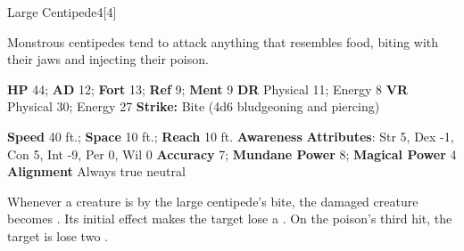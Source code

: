   \begin{monsection}{Large Centipede}{4}[4]
    \vspace{-1em}\vspace{-1em}
    \vspace{0em}

    
    Monstrous centipedes tend to attack anything that resembles food, biting with their jaws and injecting their poison.
  
    

    \begin{spellcontent}
      \begin{spelltargetinginfo}
        \pari \textbf{HP} 44;
          \textbf{AD} 12;
          \textbf{Fort} 13;
          \textbf{Ref} 9;
          \textbf{Ment} 9
        \pari \textbf{DR} Physical 11; Energy 8
        \pari \textbf{VR} Physical 30; Energy 27
        \pari \textbf{Strike:}
            Bite  (4d6 bludgeoning and piercing)
      \end{spelltargetinginfo}
    \end{spellcontent}
    \begin{monsterfooter}
      \pari \textbf{Speed} 40 ft.;
        \textbf{Space} 10 ft.;
        \textbf{Reach} 10 ft.
      \pari \textbf{Awareness} 
      \pari \textbf{Attributes}:
        Str 5, Dex -1,
        Con 5, Int -9,
        Per 0, Wil 0
      \pari \textbf{Accuracy} 7;
        \textbf{Mundane Power} 8;
      \textbf{Magical Power} 4
      \pari \textbf{Alignment} Always true neutral
    \end{monsterfooter}
  \end{monsection}
    Whenever a creature is  by the large centipede's bite,
      the damaged creature becomes .
    Its initial effect makes the target lose a .
    On the poison's third hit, the target is lose two .
  
